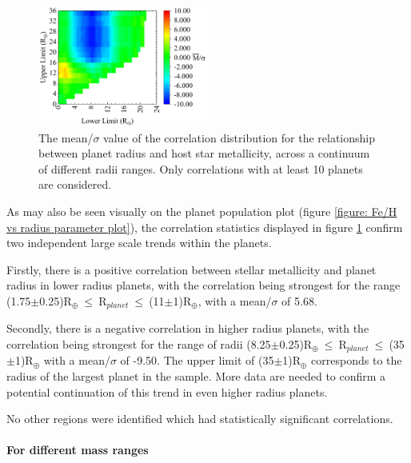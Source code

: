 \documentclass[a4paper,twocolumn,12pt]{article}
\begin{document}
\begin{figure}[h!]
    \centering
    \includegraphics[width=0.5\textwidth]{Graphs/FeH vs Radius correlations - Radii ranges.pdf}
    \caption{The mean/$\sigma$ value of the correlation distribution for the relationship between planet radius and host star metallicity, across a continuum of different radii ranges. Only correlations with at least 10 planets are considered.}
    \label{figure: Fe/H vs Radius correlations - Radii ranges}
\end{figure}

As may also be seen visually on the planet population plot (figure \ref{figure: Fe/H vs radius parameter plot}), the correlation statistics displayed in figure \ref{figure: Fe/H vs Radius correlations - Radii ranges} confirm two independent large scale trends within the planets.

Firstly, there is a positive correlation between stellar metallicity and planet radius in lower radius planets, with the correlation being strongest for the range (1.75$\pm$0.25)R$_{\oplus}~\leq~$R$_{planet}~\leq~$(11$\pm$1)R$_{\oplus}$, with a mean/$\sigma$ of 5.68.

Secondly, there is a negative correlation in higher radius planets, with the correlation being strongest for the range of radii (8.25$\pm$0.25)R$_{\oplus}~\leq~$R$_{planet}~\leq~$(35$\pm$1)R$_{\oplus}$ with a mean/$\sigma$ of -9.50. The upper limit of (35$\pm$1)R$_{\oplus}$ corresponds to the radius of the largest planet in the sample. More data are needed to confirm a potential continuation of this trend in even higher radius planets.

No other regions were identified which had statistically significant correlations.




\paragraph{For different mass ranges}
\vspace{-0.7em}
\end{document}
